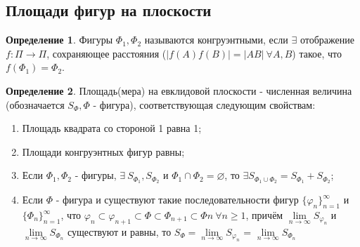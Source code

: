 \documentclass[a4paper, 12pt]{article}
\renewcommand{\phi}{\varphi}
\theoremstyle{definition}
\newtheorem*{definition}{Определение}
\begin{document}
	\subsection{Площади фигур на плоскости}
	\begin{definition}
		Фигуры $\Phi_{1}, \Phi_{2}$ называются конгруэнтными, если $\exists$ отображение $f: \Pi \rightarrow \Pi$, сохраняющее расстояния ($|f(A)f(B)| = |AB| \ \forall A, B$) такое, что $f(\Phi_{1}) = \Phi_{2}$.
	\end{definition}
	\begin{definition}
		Площадь(мера) на евклидовой плоскости - численная величина (обозначается $S_{\Phi}, \Phi$ - фигура), соответствующая следующим свойствам:
		\begin{enumerate}
			\item Площадь квадрата со стороной 1 равна 1;
			\item Площади конгруэнтных фигур равны;
			\item Если $\Phi_{1}, \Phi_{2}$ - фигуры, $\exists \ S_{\Phi_{1}}, S_{\Phi_{2}}$ и $\Phi_{1} \cap \Phi_{2} = \varnothing$, то $\exists S_{\Phi_{1}\cup\Phi_{2}} = S_{\Phi_{1}} + S_{\Phi_{2}}$; 
			\item Если $\Phi$ - фигура и существуют такие последовательности фигур $\{\phi_{n}\}_{n=1}^{\infty}$ и $\{\Phi_{n}\}_{n=1}^{\infty}$, что $\phi_{n} \subset \phi_{n+1} \subset \Phi \subset \Phi_{n+1} \subset \Phi{n} \ \forall n \geqslant 1$, причём $\lim \limits_{n\rightarrow\infty}S_{\phi_{n}}$ и $\lim \limits_{n\rightarrow\infty}S_{\Phi_{n}}$ существуют и равны, то $S_{\Phi} = \lim \limits_{n\rightarrow\infty}S_{\phi_{n}}$ = $\lim \limits_{n\rightarrow\infty}S_{\Phi_{n}}$
		\end{enumerate} 
	\end{definition}
\end{document}
